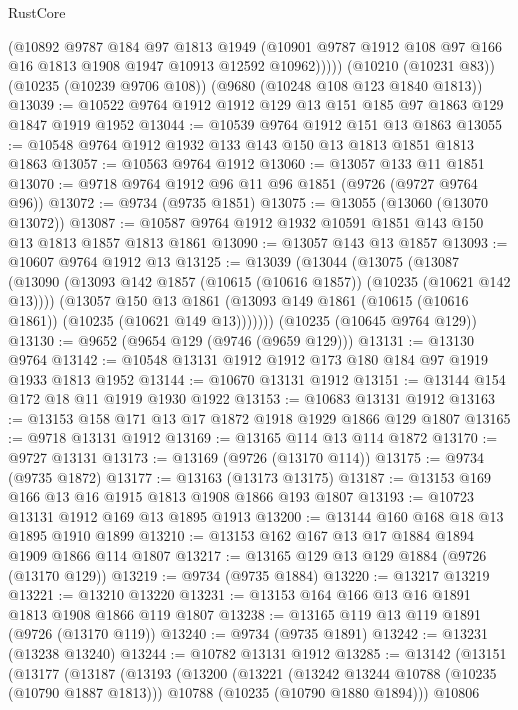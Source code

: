 \begin{lexlean}{RustCore}
\begin{coremodule}
          (@10892
            @9787
            @184
            @97
            @1813
            @1949
            (@10901 @9787 @1912 @108 @97 @166 @16 @1813 @1908 @1947 @10913 @12592 @10962)))))
    (@10210 (@10231 @83))
    (@10235 (@10239 @9706 @108))
    (@9680 (@10248 @108 @123 @1840 @1813))
@13039 := @10522 @9764 @1912 @1912 @129 @13 @151 @185 @97 @1863 @129 @1847 @1919 @1952
@13044 := @10539 @9764 @1912 @151 @13 @1863
@13055 := @10548 @9764 @1912 @1932 @133 @143 @150 @13 @1813 @1851 @1813 @1863
@13057 := @10563 @9764 @1912
@13060 := @13057 @133 @11 @1851
@13070 := @9718 @9764 @1912 @96 @11 @96 @1851 (@9726 (@9727 @9764 @96))
@13072 := @9734 (@9735 @1851)
@13075 := @13055 (@13060 (@13070 @13072))
@13087 := @10587 @9764 @1912 @1932 @10591 @1851 @143 @150 @13 @1813 @1857 @1813 @1861
@13090 := @13057 @143 @13 @1857
@13093 := @10607 @9764 @1912 @13
@13125 := @13039
    (@13044
      (@13075
        (@13087
          (@13090 (@13093 @142 @1857 (@10615 (@10616 @1857)) (@10235 (@10621 @142 @13))))
          (@13057
            @150
            @13
            @1861
            (@13093 @149 @1861 (@10615 (@10616 @1861)) (@10235 (@10621 @149 @13)))))))
    (@10235 (@10645 @9764 @129))
@13130 := @9652 (@9654 @129 (@9746 (@9659 @129)))
@13131 := @13130 @9764
@13142 := @10548 @13131 @1912 @1912 @173 @180 @184 @97 @1919 @1933 @1813 @1952
@13144 := @10670 @13131 @1912
@13151 := @13144 @154 @172 @18 @11 @1919 @1930 @1922
@13153 := @10683 @13131 @1912
@13163 := @13153 @158 @171 @13 @17 @1872 @1918 @1929 @1866 @129 @1807
@13165 := @9718 @13131 @1912
@13169 := @13165 @114 @13 @114 @1872
@13170 := @9727 @13131
@13173 := @13169 (@9726 (@13170 @114))
@13175 := @9734 (@9735 @1872)
@13177 := @13163 (@13173 @13175)
@13187 := @13153 @169 @166 @13 @16 @1915 @1813 @1908 @1866 @193 @1807
@13193 := @10723 @13131 @1912 @169 @13 @1895 @1913
@13200 := @13144 @160 @168 @18 @13 @1895 @1910 @1899
@13210 := @13153 @162 @167 @13 @17 @1884 @1894 @1909 @1866 @114 @1807
@13217 := @13165 @129 @13 @129 @1884 (@9726 (@13170 @129))
@13219 := @9734 (@9735 @1884)
@13220 := @13217 @13219
@13221 := @13210 @13220
@13231 := @13153 @164 @166 @13 @16 @1891 @1813 @1908 @1866 @119 @1807
@13238 := @13165 @119 @13 @119 @1891 (@9726 (@13170 @119))
@13240 := @9734 (@9735 @1891)
@13242 := @13231 (@13238 @13240)
@13244 := @10782 @13131 @1912
@13285 := @13142
    (@13151
      (@13177
        (@13187
          (@13193
            (@13200
              (@13221
                (@13242 @13244 @10788 (@10235 (@10790 @1887 @1813)))
                @10788
                (@10235 (@10790 @1880 @1894)))
              @10806

\end{coremodule}
\end{lexlean}
